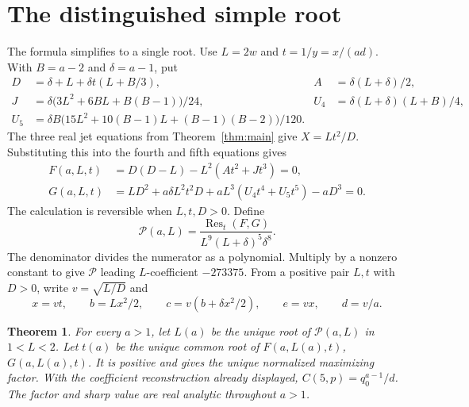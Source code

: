 \documentclass[11pt]{article}
\newtheorem{theorem}{Theorem}
\begin{document}
\section{The distinguished simple root}
\label{sec:branch}

The formula simplifies to a single root. Use \(L=2w\) and
\(t=1/y=x/(ad)\). With \(B=a-2\) and \(\delta=a-1\), put
\begin{align*}
 D&=\delta+L+\delta t(L+B/3),&
 A&=\delta(L+\delta)/2,\\
 J&=\delta\bigl(3L^2+6BL+B(B-1)\bigr)/24,&
 U_4&=\delta(L+\delta)(L+B)/4,\\
 U_5&=\delta B\bigl(15L^2+10(B-1)L+(B-1)(B-2)\bigr)/120 .
\end{align*}
The three real jet equations from Theorem~\ref{thm:main} give
\(X=Lt^2/D\). Substituting this into the fourth and fifth
equations gives
\begin{align*}
 F(a,L,t)&=D(D-L)-L^2(At^2+Jt^3)=0,\\
 G(a,L,t)&=LD^2+a\delta L^2t^2D+
                 aL^3(U_4t^4+U_5t^5)-aD^3=0.
\end{align*}
The calculation is reversible when \(L,t,D>0\).
Define
\begin{equation}\label{eq:branch-R}
 \mathcal P(a,L)
    =\frac{\operatorname{Res}_t(F,G)}
            {L^9(L+\delta)^5\delta^8}.
\end{equation}
The denominator divides the numerator as a polynomial.
Multiply by a nonzero constant to give \(\mathcal P\)
leading \(L\)-coefficient \(-273375\).
From a positive pair \(L,t\) with \(D>0\), write
\(v=\sqrt{L/D}\) and
\[
 x=vt,\qquad b=Lx^2/2,\qquad
 c=v(b+\delta x^2/2),\qquad e=vx,\qquad d=v/a.
\]
\begin{theorem}\label{thm:fifth-unique-branch}
For every \(a>1\), let \(L(a)\) be the unique root of
\(\mathcal P(a,L)\) in \(1<L<2\). Let \(t(a)\) be the unique common
root of \(F(a,L(a),t)\), \(G(a,L(a),t)\).
It is positive and gives the unique normalized maximizing factor.
With the coefficient reconstruction already displayed,
\(C(5,p)=q_0^{a-1}/d\). The factor and sharp value are
real analytic throughout \(a>1\).
\end{theorem}
\end{document}

